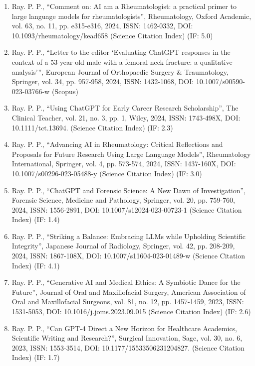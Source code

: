 \documentclass[11pt,a4paper]{moderncv}
\begin{document}
\begin{adjustwidth}{6em}{0pt}
\begin{enumerate}
		\item Ray. P. P., “Comment on: AI am a Rheumatologist: a practical primer to large language models for rheumatologists”, Rheumatology, Oxford Academic, vol. 63, no. 11, pp. e315-e316, 2024, ISSN: 1462-0332, DOI: 10.1093/rheumatology/kead658 (Science Citation Index) (IF: 5.0)
		
		\item Ray. P. P., “Letter to the editor ‘Evaluating ChatGPT responses in the context of a 53-year-old male with a femoral neck fracture: a qualitative analysis’”, European Journal of Orthopaedic Surgery \& Traumatology, Springer, vol. 34, pp. 957-958, 2024, ISSN: 1432-1068, DOI: 10.1007/s00590-023-03766-w (Scopus) 
		
		\item Ray. P. P., “Using ChatGPT for Early Career Research Scholarship”, The Clinical Teacher, vol. 21, no. 3, pp. 1, Wiley, 2024, ISSN: 1743-498X, DOI: 10.1111/tct.13694. (Science Citation Index) (IF: 2.3)
		
		\item Ray. P. P., “Advancing AI in Rheumatology: Critical Reflections and Proposals for Future Research Using Large Language Models”, Rheumatology International, Springer, vol. 4, pp. 573-574, 2024, ISSN: 1437-160X, DOI: 10.1007/s00296-023-05488-y (Science Citation Index) (IF: 3.0)
		
		\item Ray. P. P., “ChatGPT and Forensic Science: A New Dawn of Investigation”, Forensic Science, Medicine and Pathology, Springer, vol. 20, pp. 759-760, 2024, ISSN: 1556-2891, DOI: 10.1007/s12024-023-00723-1 (Science Citation Index) (IF: 1.4)
		
		\item Ray. P. P., “Striking a Balance: Embracing LLMs while Upholding Scientific Integrity”, Japanese Journal of Radiology, Springer, vol. 42, pp. 208-209, 2024, ISSN: 1867-108X, DOI: 10.1007/s11604-023-01489-w (Science Citation Index) (IF: 4.1)
		
		\item Ray. P. P., “Generative AI and Medical Ethics: A Symbiotic Dance for the Future”, Journal of Oral and Maxillofacial Surgery, American Association of Oral and Maxillofacial Surgeons, vol. 81, no. 12, pp. 1457-1459, 2023, ISSN: 1531-5053, DOI: 10.1016/j.joms.2023.09.015 (Science Citation Index) (IF: 2.6)
		
		\item Ray. P. P., “Can GPT-4 Direct a New Horizon for Healthcare Academics, Scientific Writing and Research?”, Surgical Innovation, Sage, vol. 30, no. 6, 2023, ISSN: 1553-3514, DOI: 10.1177/15533506231204827. (Science Citation Index) (IF: 1.7)
		

\end{enumerate}
\end{adjustwidth}
\end{document}

